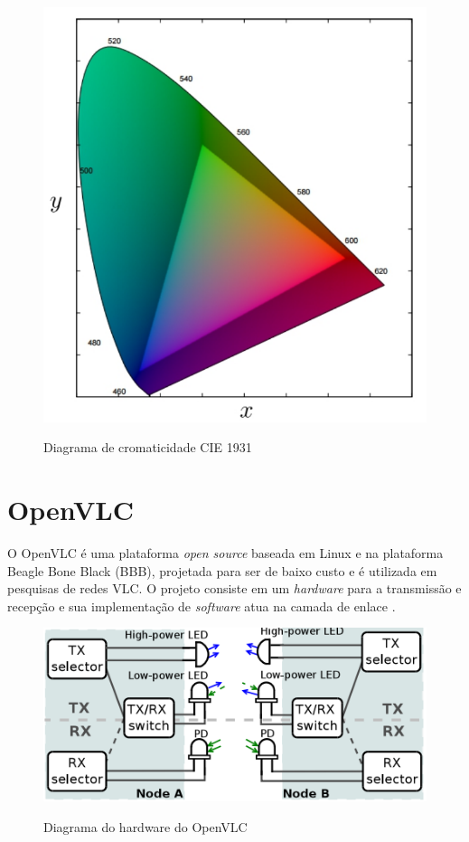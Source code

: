 \begin{figure}[!htbp]
  \caption{Diagrama de cromaticidade CIE 1931}
  \includegraphics[scale=0.4]{images/csk.png}
  \label{fig:}
\end{figure}


\section{OpenVLC}

O OpenVLC é uma plataforma \textit{open source} baseada em  Linux e na plataforma Beagle Bone Black (BBB), projetada para ser de baixo custo e é utilizada em pesquisas de redes VLC. O projeto consiste em um \textit{hardware} para a transmissão e recepção e sua implementação de \textit{software} atua na camada de enlace \cite{OpenVLCB}.

\begin{figure}[!htbp]
    \caption{Diagrama do hardware do OpenVLC}
    \includegraphics[scale=0.7]{images/diagram_cape_OpenVLC.png}
    \label{figura:diagramaVLC}
\end{figure}


